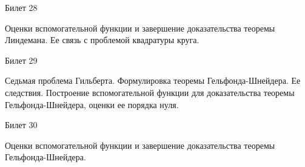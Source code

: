 \documentclass[a4paper,12pt]{article}
\begin{document}
\newpage
\begin{mybox2}{\hypertarget{bil28}{Билет 28}}

\begin{formbox}{}
Оценки вспомогательной функции и завершение доказательства теоремы Линдемана. Ее связь с проблемой квадратуры круга.
\end{formbox}

\end{mybox2}

\newpage
\begin{mybox}{\hypertarget{bil29}{Билет 29}}

\begin{formbox}{}
Седьмая проблема Гильберта. Формулировка теоремы Гельфонда-Шнейдера. Ее следствия. Построение вспомогательной функции для доказательства теоремы Гельфонда-Шнейдера, оценки ее порядка нуля.
\end{formbox}

\end{mybox}

\newpage
\begin{mybox2}{\hypertarget{bil30}{Билет 30}}

\begin{formbox}{}
Оценки вспомогательной функции и завершение доказательства теоремы Гельфонда-Шнейдера.
\end{formbox}

\end{mybox2}




















\newpage
\end{document}

